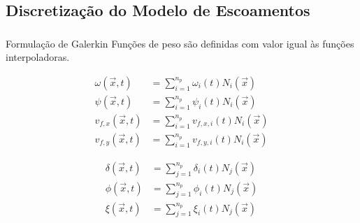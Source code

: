 \documentclass{beamer}
\begin{document}
\subsection{Discretização do Modelo de Escoamentos}
\begin{frame}
  \frametitle{\subsecname}
  
  \begin{block}{Formulação de Galerkin}
    Funções de peso são definidas com valor igual às funções interpoladoras.
    
    \begin{minipage}{.45\textwidth}
      \vspace*{-\baselineskip}\setlength\belowdisplayshortskip{0pt} %
      \begin{align*}
	\omega(\vec{x}, t) &= \sum_{i=1}^{n_p} \omega_i(t) N_i(\vec{x}) \\
	\psi(\vec{x}, t) &= \sum_{i=1}^{n_p} \psi_i(t) N_i(\vec{x}) \\
	v_{f,x}(\vec{x}, t) &= \sum_{i=1}^{n_p} v_{f,x,i}(t) N_i(\vec{x}) \\
	v_{f,y}(\vec{x}, t) &= \sum_{i=1}^{n_p} v_{f,y,i}(t) N_i(\vec{x}) 
      \end{align*}
    \end{minipage}
    \hfill
    \begin{minipage}{.45\textwidth}
      \vspace*{-\baselineskip}\setlength\belowdisplayshortskip{0pt} %
      \begin{align*}
	\delta(\vec{x}, t) &= \sum_{j=1}^{n_p} \delta_i(t) N_j(\vec{x}) \\
	\phi(\vec{x}, t) &= \sum_{j=1}^{n_p} \phi_i(t) N_j(\vec{x}) \\
	\xi(\vec{x}, t) &= \sum_{j=1}^{n_p} \xi_i(t) N_j(\vec{x})
      \end{align*}
    \end{minipage}
  \end{block}
\end{frame}
\end{document}
